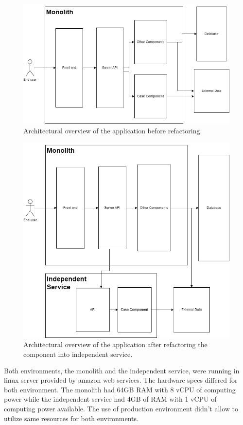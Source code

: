 \begin{figure}
    \includegraphics[width=\textwidth]{images/monolith_architecture.png}
    \caption{Architectural overview of the application before refactoring.}
    \label{figure:architecture:monolith}
\end{figure}
\begin{figure}
    \includegraphics[width=\textwidth]{images/independent_service_arcitecture.png}
    \caption{Architectural overview of the application after refactoring the component into independent service.}
    \label{figure:architecture:independent_service}
\end{figure}

Both environments, the monolith and the independent service, were running in linux server provided by amazon web services.
The hardware specs differed for both environment.
The monolith had 64GB RAM with 8 vCPU of computing power while the independent service had 4GB of RAM with 1 vCPU of computing power available.
The use of production environment didn't allow to utilize same resources for both environments.

